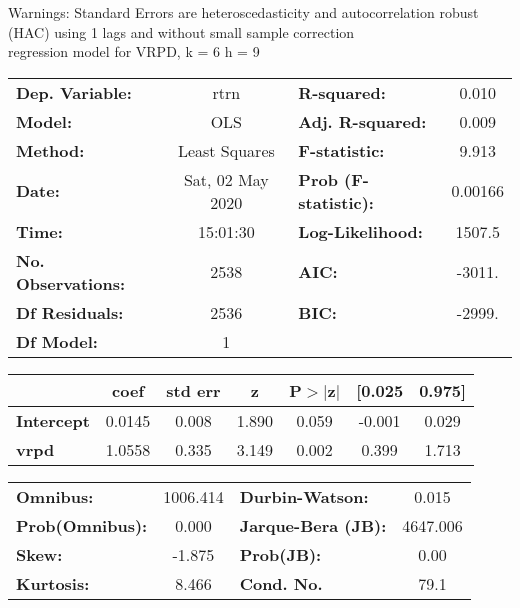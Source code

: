 Warnings: \newline
 [1] Standard Errors are heteroscedasticity and autocorrelation robust (HAC) using 1 lags and without small sample correction\\ 

regression model for VRPD, k = 6 h = 9\begin{center}
\begin{tabular}{lclc}
\toprule
\textbf{Dep. Variable:}    &       rtrn       & \textbf{  R-squared:         } &     0.010   \\
\textbf{Model:}            &       OLS        & \textbf{  Adj. R-squared:    } &     0.009   \\
\textbf{Method:}           &  Least Squares   & \textbf{  F-statistic:       } &     9.913   \\
\textbf{Date:}             & Sat, 02 May 2020 & \textbf{  Prob (F-statistic):} &  0.00166    \\
\textbf{Time:}             &     15:01:30     & \textbf{  Log-Likelihood:    } &    1507.5   \\
\textbf{No. Observations:} &        2538      & \textbf{  AIC:               } &    -3011.   \\
\textbf{Df Residuals:}     &        2536      & \textbf{  BIC:               } &    -2999.   \\
\textbf{Df Model:}         &           1      & \textbf{                     } &             \\
\bottomrule
\end{tabular}
\begin{tabular}{lcccccc}
                   & \textbf{coef} & \textbf{std err} & \textbf{z} & \textbf{P$> |$z$|$} & \textbf{[0.025} & \textbf{0.975]}  \\
\midrule
\textbf{Intercept} &       0.0145  &        0.008     &     1.890  &         0.059        &       -0.001    &        0.029     \\
\textbf{vrpd}      &       1.0558  &        0.335     &     3.149  &         0.002        &        0.399    &        1.713     \\
\bottomrule
\end{tabular}
\begin{tabular}{lclc}
\textbf{Omnibus:}       & 1006.414 & \textbf{  Durbin-Watson:     } &    0.015  \\
\textbf{Prob(Omnibus):} &   0.000  & \textbf{  Jarque-Bera (JB):  } & 4647.006  \\
\textbf{Skew:}          &  -1.875  & \textbf{  Prob(JB):          } &     0.00  \\
\textbf{Kurtosis:}      &   8.466  & \textbf{  Cond. No.          } &     79.1  \\
\bottomrule
\end{tabular}
\end{center}

